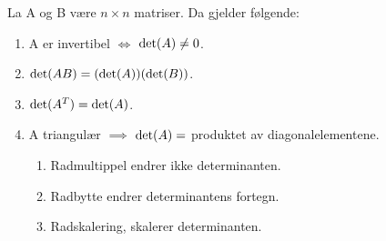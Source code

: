 La A og B være $n\times n$ matriser.
Da gjelder følgende:
\begin{enumerate}
  \item A er invertibel $\iff$ $\text{det}(A) \neq 0$.
  \item $\text{det}(AB) = (\text{det}(A))(\text{det}(B))$.
  \item $\text{det}(A^T) = \text{det}(A)$.
  \item A triangulær $\implies$ $\text{det}(A) =$ produktet av diagonalelementene.
  \begin{enumerate}[label=\alph*]
    \item Radmultippel endrer ikke determinanten.
    \item Radbytte endrer determinantens fortegn.
    \item Radskalering, skalerer determinanten.
  \end{enumerate}
\end{enumerate}
